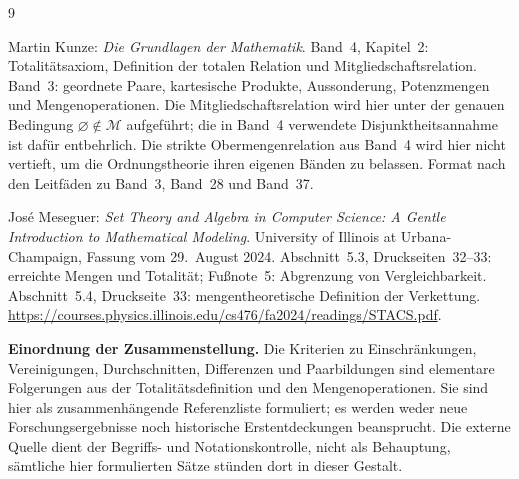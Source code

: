 \renewcommand{\bibname}{Quellen und Bandzuordnung}
\begin{thebibliography}{9}
\footnotesize
\setlength{\itemsep}{4pt}
\setlength{\parskip}{0pt}

Martin Kunze: \emph{Die Grundlagen der Mathematik}.
Band~4, Kapitel~2: Totalitätsaxiom, Definition der totalen Relation
und Mitgliedschaftsrelation.
Band~3: geordnete Paare, kartesische Produkte, Aussonderung,
Potenzmengen und Mengenoperationen.
Die Mitgliedschaftsrelation wird hier unter der genauen Bedingung
$\varnothing\notin\mathcal M$ aufgeführt; die in Band~4 verwendete
Disjunktheitsannahme ist dafür entbehrlich.
Die strikte Obermengenrelation aus Band~4 wird hier nicht vertieft,
um die Ordnungstheorie ihren eigenen Bänden zu belassen.
Format nach den Leitfäden zu Band~3, Band~28 und Band~37.

José Meseguer: \emph{Set Theory and Algebra in Computer Science:
A Gentle Introduction to Mathematical Modeling}.
University of Illinois at Urbana-Champaign, Fassung vom
29.~August 2024.
Abschnitt~5.3, Druckseiten~32--33: erreichte Mengen und
Totalität; Fußnote~5: Abgrenzung von Vergleichbarkeit.
Abschnitt~5.4, Druckseite~33: mengentheoretische Definition
der Verkettung.
\url{https://courses.physics.illinois.edu/cs476/fa2024/readings/STACS.pdf}.

\end{thebibliography}

\noindent\textbf{Einordnung der Zusammenstellung.}
Die Kriterien zu Einschränkungen, Vereinigungen, Durchschnitten,
Differenzen und Paarbildungen sind elementare Folgerungen aus
der Totalitätsdefinition und den Mengenoperationen.
Sie sind hier als zusammenhängende Referenzliste formuliert;
es werden weder neue Forschungsergebnisse noch historische
Erstentdeckungen beansprucht.
Die externe Quelle dient der Begriffs- und Notationskontrolle,
nicht als Behauptung, sämtliche hier formulierten Sätze stünden
dort in dieser Gestalt.
